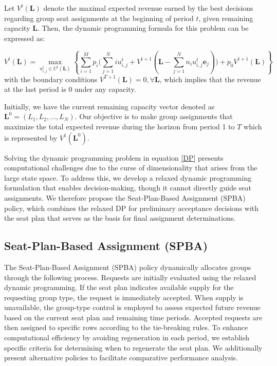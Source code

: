 Let $V^{t}(\mathbf{L})$ denote the maximal expected revenue earned by the best decisions regarding group seat assignments at the beginning of period $t$, given remaining capacity $\mathbf{L}$. Then, the dynamic programming formula for this problem can be expressed as:

\begin{equation}\label{DP}
V^{t}(\mathbf{L}) = \max_{u_{i,j}^{t} \in U^{t}(\mathbf{L})}\left\{\sum_{i=1}^{M} p_i \bigl( \sum_{j=1}^{N} i u_{i,j}^{t} + V^{t+1}(\mathbf{L} - \sum_{j=1}^{N} n_i u_{i,j}^{t}\mathbf{e}_j)\bigr) + p_0 V^{t+1}(\mathbf{L})\right\}
\end{equation}
with the boundary conditions $V^{T+1}(\mathbf{L}) = 0, \forall \mathbf{L}$, which implies that the revenue at the last period is 0 under any capacity.

Initially, we have the current remaining capacity vector denoted as $\mathbf{L}^{0} = (L_1, L_2, \ldots, L_N)$. Our objective is to make group assignments that maximize the total expected revenue during the horizon from period 1 to $T$ which is represented by $V^{1}(\mathbf{L}^{0})$.


Solving the dynamic programming problem in equation \eqref{DP} presents computational challenges due to the curse of dimensionality that arises from the large state space. To address this, we develop a relaxed dynamic programming formulation that enables decision-making, though it cannot directly guide seat assignments. We therefore propose the Seat-Plan-Based Assignment (SPBA) policy, which combines the relaxed DP for preliminary acceptance decisions with the seat plan that serves as the basis for final assignment determinations.



\subsection{Seat-Plan-Based Assignment (SPBA)}
The Seat-Plan-Based Assignment (SPBA) policy dynamically allocates groups through the following process. Requests are initially evaluated using the relaxed dynamic programming. If the seat plan indicates available supply for the requesting group type, the request is immediately accepted. When supply is unavailable, the group-type control is employed to assess expected future revenue based on the current seat plan and remaining time periods. Accepted requests are then assigned to specific rows according to the tie-breaking rules. To enhance computational efficiency by avoiding regeneration in each period, we establish specific criteria for determining when to regenerate the seat plan. We additionally present alternative policies to facilitate comparative performance analysis.

